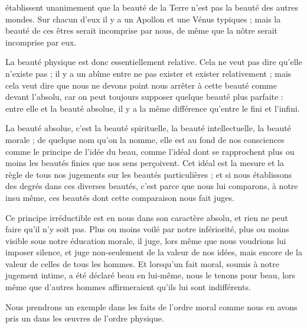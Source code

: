 \documentclass[a4paper, 11pt, oneside]{article}
\begin{document}
établissent unanimement que la beauté de la Terre n'est pas la beauté des autres mondes. Sur chacun d'eux il y a un Apollon et une Vénus typiques ; mais la beauté de ces êtres serait incomprise par nous, de même que la nôtre serait incomprise par eux.

La beauté physique est donc essentiellement relative. Cela ne veut pas dire qu'elle n'existe pas ; il y a un abîme entre ne pas exister et exister relativement ; mais cela veut dire que nous ne devons point nous arrêter à cette beauté comme devant l'absolu, car on peut toujours supposer quelque beauté plus parfaite : entre elle et la beauté absolue, il y a la même différence qu'entre le fini et l'infini.

La beauté absolue, c'est la beauté spirituelle, la beauté intellectuelle, la beauté morale ; de quelque nom qu'on la nomme, elle est au fond de nos consciences comme le principe de l'idée du beau, comme l'idéal dont se rapprochent plus ou moins les beautés finies que nos sens perçoivent. Cet idéal est la mesure et la règle de tous nos jugements sur les beautés particulières ; et si nous établissons des degrés dans ces diverses beautés, c'est parce que nous lui comparons, à notre insu même, ces beautés dont cette comparaison nous fait juges.

Ce principe irréductible est en nous dans son caractère absolu, et rien ne peut faire qu'il n'y soit pas. Plus ou moins voilé par notre infériorité, plus ou moins visible sous notre éducation morale, il juge, lors même que nous voudrions lui imposer silence, et juge non-seulement de la valeur de nos idées, mais encore de la valeur de celles de tous les hommes. Et lorsqu'un fait moral, soumis à notre jugement intime, a été déclaré beau en lui-même, nous le tenons pour beau, lors même que d'autres hommes affirmeraient qu'ils lui sont indifférents.

Nous prendrons un exemple dans les faits de l'ordre moral comme nous en avons pris un dans les œuvres de l'ordre physique.
\end{document}
